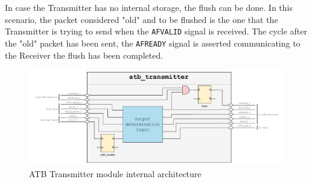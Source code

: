 In case the Transmitter has no internal storage, the flush can be done.
In this scenario, the packet considered "old" and to be flushed is the one that the Transmitter 
is trying to send when the \texttt{AFVALID} signal is received.
The cycle after the "old" packet has been sent, the \texttt{AFREADY} signal is asserted 
communicating to the Receiver the flush has been completed.

\begin{figure}[H]
    \centering
    \includegraphics[width=1\textwidth]{img/atb_transmitter.pdf}
    \caption{ATB Transmitter module internal architecture}
    \label{fig:atb_transmitter_architecture}
\end{figure}